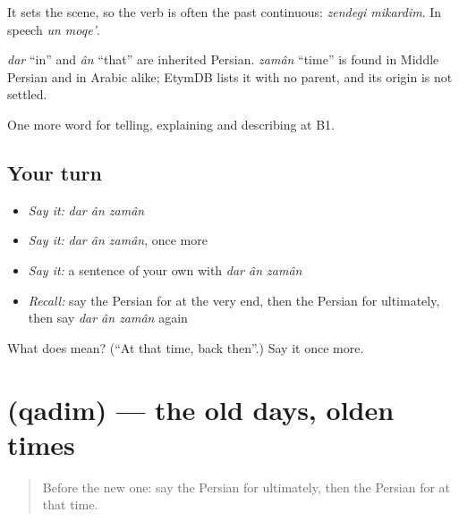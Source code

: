 It sets the scene, so the verb is often the past continuous: \emph{zendegi mikardim}. In speech \emph{un moqe'}.

\begin{cousinweb}
\emph{dar} \textquotedblleft{}in\textquotedblright{} and \emph{ân} \textquotedblleft{}that\textquotedblright{} are inherited Persian. \emph{zamân} \textquotedblleft{}time\textquotedblright{} is found in Middle Persian and in Arabic alike; EtymDB lists it with no parent, and its origin is not settled.
\end{cousinweb}

\begin{grammarlens}[title={What you've built}]
One more word for telling, explaining and describing at B1.
\end{grammarlens}

\subsection*{Your turn}
\begin{itemize}
\raggedright
  \item \emph{Say it:} \emph{dar ân zamân}
  \item \emph{Say it:} \emph{dar ân zamân}, once more
  \item \emph{Say it:} a sentence of your own with \emph{dar ân zamân}
  \item \emph{Recall:} say the Persian for at the very end, then the Persian for ultimately, then say \emph{dar ân zamân} again
\end{itemize}

\begin{tcolorbox}[breakable,colback=teal!4,colframe=teal!35!black,title={Before you move on}]
What does    mean? (\textquotedblleft{}At that time, back then\textquotedblright{}.) Say it once more.
\end{tcolorbox}
\section[\texorpdfstring{\fa{قدیم} (qadim)}{قدیم (qadim)}]{ (qadim) — the old days, olden times}

\label{lesson:FA-C304-qadim}



\begin{quote}
Before the new one: say the Persian for ultimately, then the Persian for at that time.
\end{quote}

